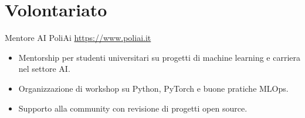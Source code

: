 \documentclass[a4paper, serif, 10pt]{moderncv}
\begin{document}
\section{Volontariato}

        {Mentore AI}
        {PoliAi}
        {\url{https://www.poliai.it}}
        {}
        {\begin{itemize}
\item Mentorship per studenti universitari su progetti di machine learning e carriera nel settore AI.
\item Organizzazione di workshop su Python, PyTorch e buone pratiche MLOps.
\item Supporto alla community con revisione di progetti open source.
\end{itemize}}
    
\end{document}
